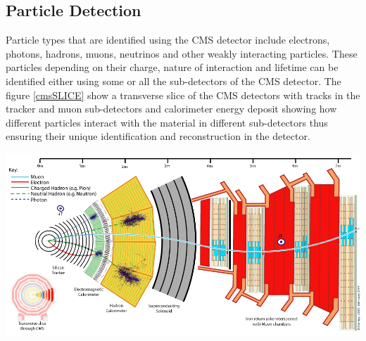 \subsection{Particle Detection}
Particle types that are identified using the CMS detector include electrons, photons, hadrons, muons, neutrinos and other weakly interacting particles. These particles depending on their charge, nature of interaction and lifetime can be identified either using some or all the sub-detectors of the CMS detector.
The figure \eqref{cmsSLICE} show a  transverse slice of the CMS detectors with tracks in the tracker and muon sub-detectors and calorimeter energy deposit showing how different particles interact with the material in different sub-detectors thus ensuring their unique identification and reconstruction in the detector.

\begin{center}\label{CMSSLICE}
\centering
\mbox{\includegraphics[scale=0.4]{THESISPLOTS/CMS_Slice.png}} 
\label{fig:cmsSLICE}
\end{center}


